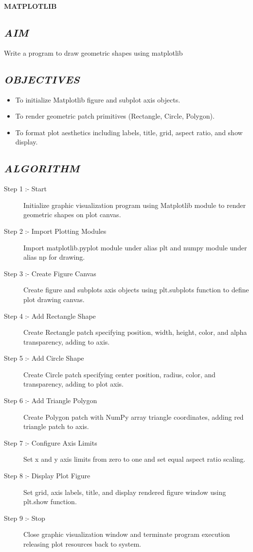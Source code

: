 \documentclass[11pt,a4paper]{article}
\begin{document}
\vspace{0.2cm}
\begin{center}
{\Huge \textbf{\textcolor{navyblue}{MATPLOTLIB}}}
\end{center}
\vspace{0.3cm}

\subsection*{\textit{AIM}}
Write a program to draw geometric shapes using matplotlib

\subsection*{\textit{OBJECTIVES}}
\begin{itemize}
  \item To initialize Matplotlib figure and subplot axis objects.
  \item To render geometric patch primitives (Rectangle, Circle, Polygon).
  \item To format plot aesthetics including labels, title, grid, aspect ratio, and show display.
\end{itemize}

\subsection*{\textit{ALGORITHM}}
\begin{description}
  \item[Step 1 :- Start] Initialize graphic visualization program using Matplotlib module to render geometric shapes on plot canvas.
  \item[Step 2 :- Import Plotting Modules] Import matplotlib.pyplot module under alias plt and numpy module under alias np for drawing.
  \item[Step 3 :- Create Figure Canvas] Create figure and subplots axis objects using plt.subplots function to define plot drawing canvas.
  \item[Step 4 :- Add Rectangle Shape] Create Rectangle patch specifying position, width, height, color, and alpha transparency, adding to axis.
  \item[Step 5 :- Add Circle Shape] Create Circle patch specifying center position, radius, color, and transparency, adding to plot axis.
  \item[Step 6 :- Add Triangle Polygon] Create Polygon patch with NumPy array triangle coordinates, adding red triangle patch to axis.
  \item[Step 7 :- Configure Axis Limits] Set x and y axis limits from zero to one and set equal aspect ratio scaling.
  \item[Step 8 :- Display Plot Figure] Set grid, axis labels, title, and display rendered figure window using plt.show function.
  \item[Step 9 :- Stop] Close graphic visualization window and terminate program execution releasing plot resources back to system.
\end{description}
\end{document}
